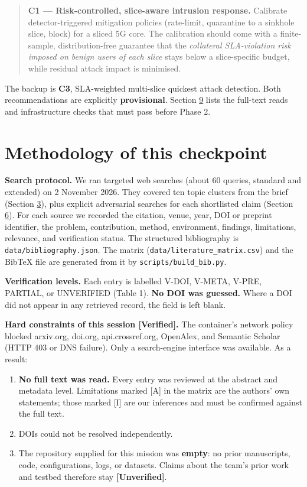\begin{quote}
\textbf{C1 --- Risk-controlled, slice-aware intrusion response.}
Calibrate detector-triggered mitigation policies (rate-limit, quarantine
to a sinkhole slice, block) for a sliced 5G core. The calibration should
come with a finite-sample, distribution-free guarantee that the
\emph{collateral SLA-violation risk imposed on benign users of each
slice} stays below a slice-specific budget, while residual attack impact
is minimised.
\end{quote}

The backup is \textbf{C3}, SLA-weighted multi-slice quickest attack
detection. Both recommendations are explicitly \textbf{provisional}.
Section \protect\hyperlink{sec:gaps}{9} lists the full-text reads and
infrastructure checks that must pass before Phase 2.

\hypertarget{sec:method}{%
\section{Methodology of this checkpoint}\label{sec:method}}

\textbf{Search protocol.} We ran targeted web searches (about 60
queries, standard and extended) on 2 November 2026. They covered ten
topic clusters from the brief (Section
\protect\hyperlink{sec:landscape}{3}), plus explicit adversarial
searches for each shortlisted claim (Section
\protect\hyperlink{sec:audit}{6}). For each source we recorded the
citation, venue, year, DOI or preprint identifier, the problem,
contribution, method, environment, findings, limitations, relevance, and
verification status. The structured bibliography is
\texttt{data/bibliography.json}. The matrix
(\texttt{data/literature\_matrix.csv}) and the BibTeX file are generated
from it by \texttt{scripts/build\_bib.py}.

\textbf{Verification levels.} Each entry is labelled V-DOI, V-META,
V-PRE, PARTIAL, or UNVERIFIED (Table 1). \textbf{No DOI was guessed.}
Where a DOI did not appear in any retrieved record, the field is left
blank.

\textbf{Hard constraints of this session {[}Verified{]}.} The
container's network policy blocked arxiv.org, doi.org, api.crossref.org,
OpenAlex, and Semantic Scholar (HTTP 403 or DNS failure). Only a
search-engine interface was available. As a result:

\begin{enumerate}
\def\labelenumi{\arabic{enumi}.}
\tightlist
\item
  \textbf{No full text was read.} Every entry was reviewed at the
  abstract and metadata level. Limitations marked {[}A{]} in the matrix
  are the authors' own statements; those marked {[}I{]} are our
  inferences and must be confirmed against the full text.
\item
  DOIs could not be resolved independently.
\item
  The repository supplied for this mission was \textbf{empty}: no prior
  manuscripts, code, configurations, logs, or datasets. Claims about the
  team's prior work and testbed therefore stay
  \textbf{{[}Unverified{]}}.
\end{enumerate}

